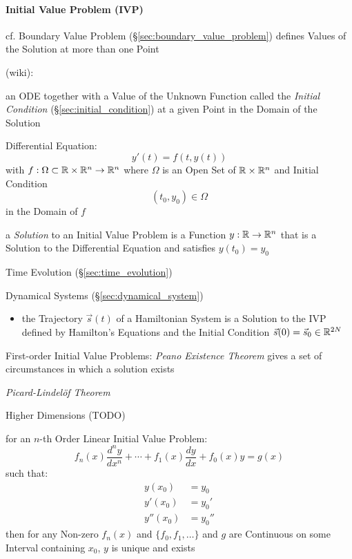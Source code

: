 \paragraph{Initial Value Problem (IVP)}\label{sec:ivp}\hfill

\fist cf. Boundary Value Problem (\S\ref{sec:boundary_value_problem}) defines
Values of the Solution at more than one Point

(wiki):

an ODE together with a Value of the Unknown Function called the \emph{Initial
  Condition} (\S\ref{sec:initial_condition}) at a given Point in the Domain of
the Solution

Differential Equation:
\[
  y'(t) = f(t, y(t))
\]
with $f : \Omega \subset \mathbb{R} \times \mathbb{R}^n \rightarrow \mathbb{R}^n$ where
$\Omega$ is an Open Set of $\mathbb{R} \times \mathbb{R}^n$ and Initial Condition
\[
  (t_0, y_0) \in \Omega
\]
in the Domain of $f$

a \emph{Solution} to an Initial Value Problem is a Function $y : \mathbb{R}
\rightarrow \mathbb{R}^n$ that is a Solution to the Differential Equation and
satisfies $y(t_0) = y_0$

\fist Time Evolution (\S\ref{sec:time_evolution})

\fist Dynamical Systems (\S\ref{sec:dynamical_system})

\begin{itemize}
  \item the Trajectory $\vec{s}(t)$ of a Hamiltonian System is a Solution to
    the IVP defined by Hamilton's Equations and the Initial Condition
    $\vec{s}(0) = \vec{s}_0 \in \mathbb{R}^{2N}$
\end{itemize}

First-order Initial Value Problems: \emph{Peano Existence Theorem} gives a set
of circumstances in which a solution exists

\emph{Picard-Lindel\"of Theorem}

Higher Dimensions (TODO)

for an $n$-th Order Linear Initial Value Problem:
\[
  f_n(x)\frac{d^ny}{dx^n} + \cdots + f_1(x)\frac{dy}{dx} + f_0(x)y = g(x)
\]
such that:
\begin{align*}
  y(x_0)   & = y_0   \\
  y'(x_0)  & = y_0'  \\
  y''(x_0) & = y_0''
\end{align*}
then for any Non-zero $f_n(x)$ and $\{f_0,f_1,\ldots\}$ and $g$ are Continuous
on some Interval containing $x_0$, $y$ is unique and exists

